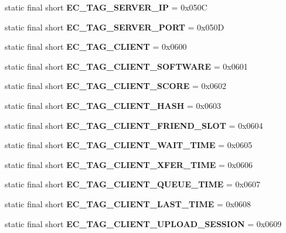 \begin{DoxyCompactItemize}
\item 
static final short {\bfseries EC\_\-TAG\_\-SERVER\_\-IP} = 0x050C\label{interfaceECCodes_a2e441f45809afc5ce7a73a653c0bb972}

\item 
static final short {\bfseries EC\_\-TAG\_\-SERVER\_\-PORT} = 0x050D\label{interfaceECCodes_a4dbb41f7d824b188740f7a78311b56a2}

\item 
static final short {\bfseries EC\_\-TAG\_\-CLIENT} = 0x0600\label{interfaceECCodes_ab44629d813a165daf6a5cc4078f69ba6}

\item 
static final short {\bfseries EC\_\-TAG\_\-CLIENT\_\-SOFTWARE} = 0x0601\label{interfaceECCodes_ae9d70adfcda16a3b40aec35fdcf35644}

\item 
static final short {\bfseries EC\_\-TAG\_\-CLIENT\_\-SCORE} = 0x0602\label{interfaceECCodes_a4cf4102a30b1dce6160b047471230e58}

\item 
static final short {\bfseries EC\_\-TAG\_\-CLIENT\_\-HASH} = 0x0603\label{interfaceECCodes_a06c84aafa13a0bb3fcdfc36a5f823054}

\item 
static final short {\bfseries EC\_\-TAG\_\-CLIENT\_\-FRIEND\_\-SLOT} = 0x0604\label{interfaceECCodes_a356ffaae5085b4971355fe906434c5be}

\item 
static final short {\bfseries EC\_\-TAG\_\-CLIENT\_\-WAIT\_\-TIME} = 0x0605\label{interfaceECCodes_ad920fe6ee8288cb275afd52bfe555099}

\item 
static final short {\bfseries EC\_\-TAG\_\-CLIENT\_\-XFER\_\-TIME} = 0x0606\label{interfaceECCodes_ae0350e49c92bd2d7413665df5fa68507}

\item 
static final short {\bfseries EC\_\-TAG\_\-CLIENT\_\-QUEUE\_\-TIME} = 0x0607\label{interfaceECCodes_a08cadcbf9a3c9e2d4448b91e3a2e5666}

\item 
static final short {\bfseries EC\_\-TAG\_\-CLIENT\_\-LAST\_\-TIME} = 0x0608\label{interfaceECCodes_abc0748e453ba941c94a751941b7b5612}

\item 
static final short {\bfseries EC\_\-TAG\_\-CLIENT\_\-UPLOAD\_\-SESSION} = 0x0609\label{interfaceECCodes_a493dd4c3ba3a76d796ffee6154549ab9}


\end{DoxyCompactItemize}

